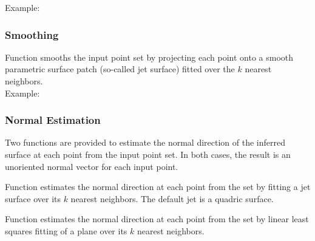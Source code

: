 Example:


\subsubsection{Smoothing}

Function  smooths the input point set by projecting each point onto a smooth parametric surface patch (so-called jet surface) fitted over the $k$ nearest neighbors. \\


Example:



\subsubsection{Normal Estimation}

Two functions are provided to estimate the normal direction of the inferred surface at each point from the input point set. In both cases, the result is an unoriented normal vector for each input point.

Function  estimates the normal direction at each point from the set by fitting a jet surface over its $k$ nearest neighbors. The default jet is a quadric surface.

Function  estimates the normal direction at each point from the set by linear least squares fitting of a plane over its $k$ nearest neighbors.

